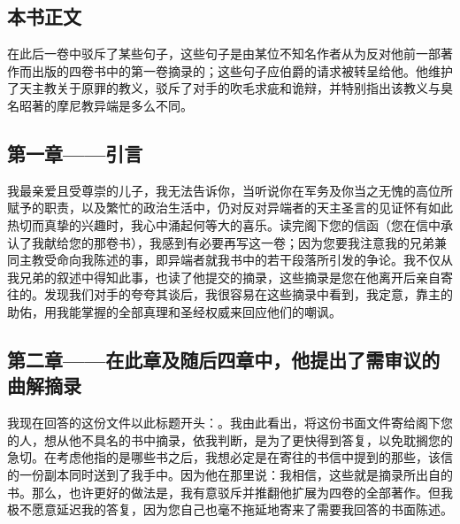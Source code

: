 \subsection{本书正文}

在此后一卷中驳斥了某些句子，这些句子是由某位不知名作者从为反对他前一部著作而出版的四卷书中的第一卷摘录的；这些句子应伯爵的请求被转呈给他。他维护了天主教关于原罪的教义，驳斥了对手的吹毛求疵和诡辩，并特别指出该教义与臭名昭著的摩尼教异端是多么不同。\par


\subsection{第一章——引言}

我最亲爱且受尊崇的儿子，我无法告诉你，当听说你在军务及你当之无愧的高位所赋予的职责，以及繁忙的政治生活中，仍对反对异端者的天主圣言的见证怀有如此热切而真挚的兴趣时，我心中涌起何等大的喜乐。读完阁下您的信函（您在信中承认了我献给您的那卷书），我感到有必要再写这一卷；因为您要我注意我的兄弟兼同主教受命向我陈述的事，即异端者就我书中的若干段落所引发的争论。我不仅从我兄弟的叙述中得知此事，也读了他提交的摘录，这些摘录是您在他离开后亲自寄往的。发现我们对手的夸夸其谈后，我很容易在这些摘录中看到，我定意，靠主的助佑，用我能掌握的全部真理和圣经权威来回应他们的嘲讽。\par


\subsection{第二章——在此章及随后四章中，他提出了需审议的曲解摘录}

我现在回答的这份文件以此标题开头：。我由此看出，将这份书面文件寄给阁下您的人，想从他不具名的书中摘录，依我判断，是为了更快得到答复，以免耽搁您的急切。在考虑他指的是哪些书之后，我想必定是在寄往的书信中提到的那些，该信的一份副本同时送到了我手中。因为他在那里说：我相信，这些就是摘录所出自的书。那么，也许更好的做法是，我有意驳斥并推翻他扩展为四卷的全部著作。但我极不愿意延迟我的答复，因为您自己也毫不拖延地寄来了需要我回答的书面陈述。\par

